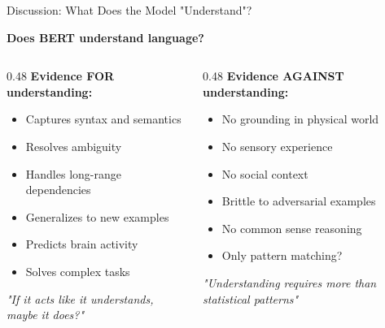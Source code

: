 \documentclass[aspectratio=169]{beamer}
\begin{document}
\begin{frame}[shrink=10]{Discussion: What Does the Model "Understand"? 🤔}
\small
\begin{center}
\LARGE
\textbf{Does BERT understand language?}
\end{center}

\vspace{1em}

\begin{columns}[T]
\begin{column}{0.48\textwidth}
\textbf{Evidence FOR understanding:}
\begin{itemize}\setlength{\itemsep}{0pt}
    \item Captures syntax and semantics
    \item Resolves ambiguity
    \item Handles long-range dependencies
    \item Generalizes to new examples
    \item Predicts brain activity
    \item Solves complex tasks
\end{itemize}

\vspace{0.5em}
\textit{"If it acts like it understands, maybe it does?"}
\end{column}

\begin{column}{0.48\textwidth}
\textbf{Evidence AGAINST understanding:}
\begin{itemize}\setlength{\itemsep}{0pt}
    \item No grounding in physical world
    \item No sensory experience
    \item No social context
    \item Brittle to adversarial examples
    \item No common sense reasoning
    \item Only pattern matching?
\end{itemize}

\vspace{0.5em}
\textit{"Understanding requires more than statistical patterns"}
\end{column}
\end{columns}

\vspace{1em}


\end{frame}
\end{document}
